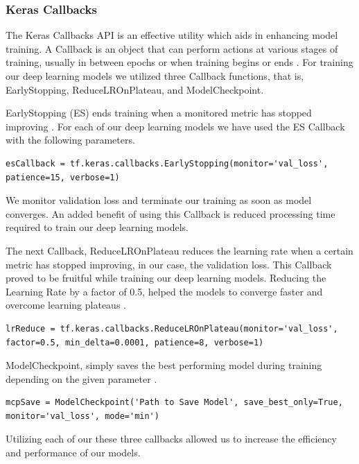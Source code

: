 \subsubsection{Keras Callbacks} \label{KCXray}

The Keras Callbacks API is an effective utility which aids in enhancing model training. A Callback is an object that can perform actions at various stages of training, usually in between epochs or when training begins or ends \cite{KCB}. For training our deep learning models we utilized three Callback functions, that is, EarlyStopping, ReduceLROnPlateau, and ModelCheckpoint.

EarlyStopping (ES) ends training when a monitored metric has stopped improving \cite{KES}. For each of our deep learning models we have used the ES Callback with the following parameters. 

\vspace{1em}
\begin{lstlisting}
esCallback = tf.keras.callbacks.EarlyStopping(monitor='val_loss', patience=15, verbose=1)
\end{lstlisting}

We monitor validation loss and terminate our training as soon as model converges. An added benefit of using this Callback is reduced processing time required to train our deep learning models.

The next Callback, ReduceLROnPlateau reduces the learning rate when a certain metric has stopped improving, in our case, the validation loss. This Callback proved to be fruitful while training our deep learning models. Reducing the Learning Rate by a factor of 0.5, helped the models to converge faster and overcome learning plateaus \cite{KLR}. 
\vspace{1em}
\begin{lstlisting}
lrReduce = tf.keras.callbacks.ReduceLROnPlateau(monitor='val_loss', factor=0.5, min_delta=0.0001, patience=8, verbose=1)
\end{lstlisting}

ModelCheckpoint, simply saves the best performing model during training depending on the given parameter \cite{KMC}.
\vspace{1em}

\begin{lstlisting}
mcpSave = ModelCheckpoint('Path to Save Model', save_best_only=True, monitor='val_loss', mode='min')
\end{lstlisting}

Utilizing each of our these three callbacks allowed us to increase the efficiency and performance of our models.


